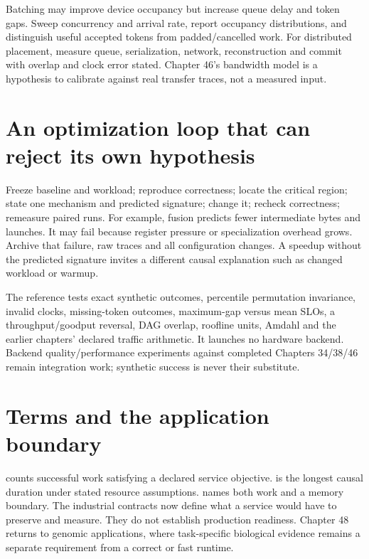 Batching may improve device occupancy but increase queue delay and token gaps.
Sweep concurrency and arrival rate, report occupancy distributions, and
distinguish useful accepted tokens from padded/cancelled work. For distributed
placement, measure queue, serialization, network, reconstruction and commit
with overlap and clock error stated. Chapter 46's bandwidth model is a
hypothesis to calibrate against real transfer traces, not a measured input.

\section{An optimization loop that can reject its own hypothesis}
\label{evod47:loop}
Freeze baseline and workload; reproduce correctness; locate the critical
region; state one mechanism and predicted signature; change it; recheck
correctness; remeasure paired runs. For example, fusion predicts fewer
intermediate bytes and launches. It may fail because register pressure or
specialization overhead grows. Archive that failure, raw traces and all
configuration changes. A speedup without the predicted signature invites a
different causal explanation such as changed workload or warmup.

The reference tests exact synthetic outcomes, percentile permutation
invariance, invalid clocks, missing-token outcomes, maximum-gap versus mean
SLOs, a throughput/goodput reversal, DAG overlap, roofline units, Amdahl and
the earlier chapters' declared traffic arithmetic. It launches no hardware
backend. Backend quality/performance experiments against completed Chapters
34/38/46 remain integration work; synthetic success is never their substitute.

\section{Terms and the application boundary}
 counts successful work satisfying a declared service objective.
 is the longest causal duration under stated resource
assumptions.  names both work and a memory boundary.
The industrial contracts now define what a service would have to preserve
and measure. They do not establish production readiness. Chapter 48 returns
to genomic applications, where task-specific biological evidence remains a
separate requirement from a correct or fast runtime.

